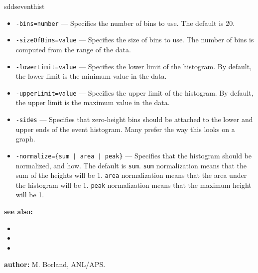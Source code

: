 \begin{sddsprog}{sddseventhist}
\begin{itemize}
      \item \verb|-bins=number| --- Specifies the number of bins to use. The default is 20.
      \item \verb|-sizeOfBins=value| --- Specifies the size of bins to use. The number of bins is computed from the range of the data.
      \item \verb|-lowerLimit=value| --- Specifies the lower limit of the histogram. By default, the lower limit is the minimum value in the data.
      \item \verb|-upperLimit=value| --- Specifies the upper limit of the histogram. By default, the upper limit is the maximum value in the data.
      \item \verb|-sides| --- Specifies that zero-height bins should be attached to the lower and upper ends of the event histogram. Many prefer the way this looks on a graph.
      \item \verb!-normalize={sum | area | peak}! --- Specifies that the histogram should be normalized, and how. The default is \verb|sum|. \verb|sum| normalization means that the sum of the heights will be 1. \verb|area| normalization means that the area under the histogram will be 1. \verb|peak| normalization means that the maximum height will be 1.
    \end{itemize}
  \item \textbf{see also:}
    \begin{itemize}
      \item {}
      \item {}
      \item {}
    \end{itemize}
  \item \textbf{author:} M. Borland, ANL/APS.
\end{sddsprog}
